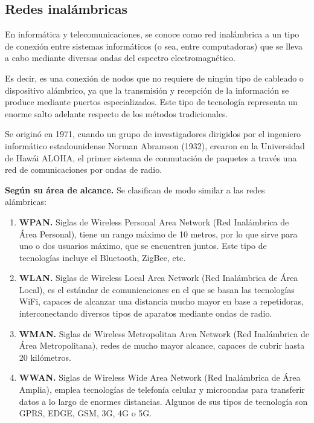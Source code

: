 \documentclass[12pt]{article}
\begin{document}
  \subsection*{Redes inalámbricas}
  En informática y telecomunicaciones, se conoce como red inalámbrica a un tipo de conexión entre sistemas informáticos (o sea, entre computadoras) que se lleva a cabo mediante diversas ondas del espectro electromagnético.

  Es decir, es una conexión de nodos que no requiere de ningún tipo de cableado o dispositivo alámbrico, ya que la transmisión y recepción de la información se produce mediante puertos especializados. Este tipo de tecnología representa un enorme salto adelante respecto de los métodos tradicionales.

  Se originó en 1971, cuando un grupo de investigadores dirigidos por el ingeniero informático estadounidense Norman Abramson (1932), crearon en la Universidad de Hawái ALOHA, el primer sistema de conmutación de paquetes a través una red de comunicaciones por ondas de radio.

  \textbf{Según su área de alcance.} Se clasifican de modo similar a las redes alámbricas:
  \begin{enumerate}
    \item \textbf{WPAN.} Siglas de Wireless Personal Area Network (Red Inalámbrica de Área Personal), tiene un rango máximo de 10 metros, por lo que sirve para uno o dos usuarios máximo, que se encuentren juntos. Este tipo de tecnologías incluye el Bluetooth, ZigBee, etc.
    \item \textbf{WLAN.} Siglas de Wireless Local Area Network (Red Inalámbrica de Área Local), es el estándar de comunicaciones en el que se basan las tecnologías WiFi, capaces de alcanzar una distancia mucho mayor en base a repetidoras, interconectando diversos tipos de aparatos mediante ondas de radio.
    \item \textbf{WMAN.} Siglas de Wireless Metropolitan Area Network (Red Inalámbrica de Área Metropolitana), redes de mucho mayor alcance, capaces de cubrir hasta 20 kilómetros.
    \item \textbf{WWAN.} Siglas de Wireless Wide Area Network (Red Inalámbrica de Área Amplia), emplea tecnologías de telefonía celular y microondas para transferir datos a lo largo de enormes distancias. Algunos de sus tipos de tecnología son GPRS, EDGE, GSM, 3G, 4G o 5G.              
  \end{enumerate}
\end{document}
